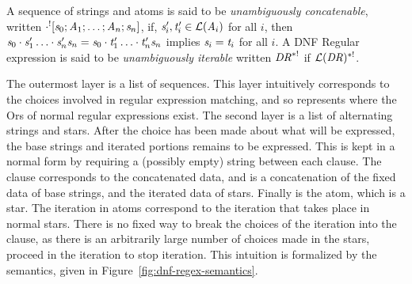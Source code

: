 \documentclass[numbers]{sigplanconf}
\begin{document}
A sequence of strings and atoms is said to be \textit{unambiguously concatenable},
written $\cdot^![\mathit{s}_0;\mathit{A}_1;\ldots;\mathit{A}_n;\mathit{s}_n]$,
if, $\mathit{s}_i',\mathit{t}_i'\in\mathcal{L}(\mathit{A}_i)$ for all $i$, then
$\mathit{s}_0\cdot\mathit{s}_1'\ldots\cdot\mathit{s}_n'\mathit{s}_n=
\mathit{s}_0\cdot\mathit{t}_1'\ldots\cdot\mathit{t}_n'\mathit{s}_n$
implies $\mathit{s}_i=\mathit{t}_i$ for all $i$.  A DNF Regular expression is said
to be \textit{unambiguously iterable} written $\mathit{DR}^{*!}$ if
$\mathcal{L}(\mathit{DR})^{*!}$.

The outermost layer is a list of sequences.
This layer intuitively corresponds to the choices involved in regular expression matching, and so represents where the Ors of normal regular expressions exist.
The second layer is a list of alternating strings and stars.
After the choice has been made about what will be expressed,
the base strings and iterated portions remains to be expressed.
This is kept in a normal form by requiring a (possibly empty) string between
each clause.
The clause corresponds to the concatenated data, and is a concatenation of the
fixed data of base strings, and the iterated data of stars.
Finally is the atom, which is a star.
The iteration in atoms correspond to the iteration that takes place in normal stars.
There is no fixed way to break the choices of the iteration into the clause,
as there is an arbitrarily large number of choices made in the stars, proceed
in the iteration to stop iteration.
This intuition is formalized by the semantics, given in
Figure~\ref{fig:dnf-regex-semantics}.
\end{document}
